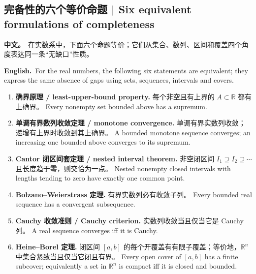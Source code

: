 \documentclass[UTF8,11pt,a4paper]{ctexart}
\newcommand{\R}{\mathbb{R}}
\newcommand{\BOTH}[2]{\par\noindent\textbf{中文。}\ #1\par\noindent\textbf{English.}\ #2\par}
\begin{document}
\subsection{完备性的六个等价命题 | Six equivalent formulations of completeness}
\BOTH{在实数系中，下面六个命题等价；它们从集合、数列、区间和覆盖四个角度表达同一条“无缺口”性质。}{For the real numbers, the following six statements are equivalent; they express the same absence of gaps using sets, sequences, intervals and covers.}
\begin{enumerate}[label=(\arabic*)]
\item \textbf{确界原理 / least-upper-bound property.} 每个非空且有上界的 $A\subset\R$ 都有上确界。 Every nonempty set bounded above has a supremum.
\item \textbf{单调有界数列收敛定理 / monotone convergence.} 单调有界实数列收敛；递增有上界时收敛到其上确界。 A bounded monotone sequence converges; an increasing one bounded above converges to its supremum.
\item \textbf{Cantor 闭区间套定理 / nested interval theorem.} 非空闭区间 $I_1\supseteq I_2\supseteq\cdots$ 且长度趋于零，则交恰为一点。 Nested nonempty closed intervals with lengths tending to zero have exactly one common point.
\item \textbf{Bolzano--Weierstrass 定理.} 有界实数列必有收敛子列。 Every bounded real sequence has a convergent subsequence.
\item \textbf{Cauchy 收敛准则 / Cauchy criterion.} 实数列收敛当且仅当它是 Cauchy 列。 A real sequence converges iff it is Cauchy.
\item \textbf{Heine--Borel 定理.} 闭区间 $[a,b]$ 的每个开覆盖有有限子覆盖；等价地，$\R^n$ 中集合紧致当且仅当它闭且有界。 Every open cover of $[a,b]$ has a finite subcover; equivalently a set in $\R^n$ is compact iff it is closed and bounded.
\end{enumerate}
\end{document}
